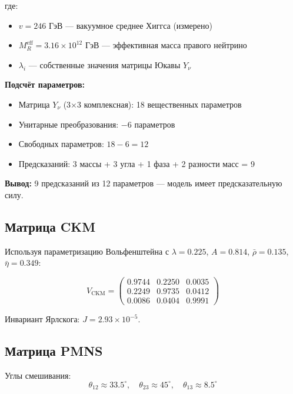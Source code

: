 \documentclass[12pt,a4paper,twoside]{article}
\newcommand{\CKM}{V_{\text{CKM}}}
\theoremstyle{definition}
\begin{document}
где:
\begin{itemize}
    \item $v = 246$ ГэВ — вакуумное среднее Хиггса (измерено)
    \item $M_R^{\text{eff}} = 3.16\times10^{12}$ ГэВ — эффективная масса правого нейтрино
    \item $\lambda_i$ — собственные значения матрицы Юкавы $Y_\nu$
\end{itemize}

\textbf{Подсчёт параметров:}
\begin{itemize}
    \item Матрица $Y_\nu$ (3×3 комплексная): 18 вещественных параметров
    \item Унитарные преобразования: $-6$ параметров
    \item Свободных параметров: $18 - 6 = 12$
    \item Предсказаний: 3 массы + 3 угла + 1 фаза + 2 разности масс = 9
\end{itemize}

\textbf{Вывод:} 9 предсказаний из 12 параметров — модель имеет предсказательную силу.

\subsection{Матрица CKM}

Используя параметризацию Вольфенштейна с $\lambda = 0.225$, $A = 0.814$, $\bar{\rho} = 0.135$, $\bar{\eta} = 0.349$:

\begin{equation}
\CKM = \begin{pmatrix}
0.9744 & 0.2250 & 0.0035 \\
0.2249 & 0.9735 & 0.0412 \\
0.0086 & 0.0404 & 0.9991
\end{pmatrix}
\label{eq:ckm}
\end{equation}

Инвариант Ярлскога: $J = 2.93 \times 10^{-5}$.

\subsection{Матрица PMNS}

Углы смешивания:
\begin{equation}
\theta_{12} \approx 33.5^\circ, \quad \theta_{23} \approx 45^\circ, \quad \theta_{13} \approx 8.5^\circ
\label{eq:pmns_angles}
\end{equation}
\end{document}
